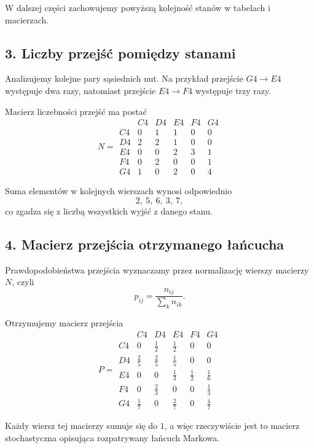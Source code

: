 \documentclass[11pt,a4paper]{article}
\theoremstyle{plain}
\theoremstyle{definition}
\begin{document}
\begin{rozwiazaniebox}
W dalszej cz\k{e}\'sci zachowujemy powy\.zsz\k{a} kolejno\'s\'c stan\'ow w tabelach i macierzach.

\subsection*{3. Liczby przej\'s\'c pomi\k{e}dzy stanami}

Analizujemy kolejne pary s\k{a}siednich nut. Na przyk\l ad przej\'scie \(G4 \to E4\) wyst\k{e}puje
dwa razy, natomiast przej\'scie \(E4 \to F4\) wyst\k{e}puje trzy razy.

Macierz liczebno\'sci przej\'s\'c ma posta\'c
\[
N=
\begin{array}{c|ccccc}
     & C4 & D4 & E4 & F4 & G4 \\ \hline
    C4 & 0 & 1 & 1 & 0 & 0 \\
    D4 & 2 & 2 & 1 & 0 & 0 \\
    E4 & 0 & 0 & 2 & 3 & 1 \\
    F4 & 0 & 2 & 0 & 0 & 1 \\
    G4 & 1 & 0 & 2 & 0 & 4
\end{array}
\]

Suma element\'ow w kolejnych wierszach wynosi odpowiednio
\[
    2,\ 5,\ 6,\ 3,\ 7,
\]
co zgadza si\k{e} z liczb\k{a} wszystkich wyj\'s\'c z danego stanu.

\subsection*{4. Macierz przej\'scia otrzymanego \l a\'ncucha}

Prawdopodobie\'nstwa przej\'scia wyznaczamy przez normalizacj\k{e} wierszy macierzy \(N\), czyli
\[
    p_{ij}=\frac{n_{ij}}{\sum\limits_k n_{ik}}.
\]

Otrzymujemy macierz przej\'scia
\[
P=
\begin{array}{c|ccccc}
     & C4 & D4 & E4 & F4 & G4 \\ \hline
    C4 & 0 & \tfrac{1}{2} & \tfrac{1}{2} & 0 & 0 \\
    D4 & \tfrac{2}{5} & \tfrac{2}{5} & \tfrac{1}{5} & 0 & 0 \\
    E4 & 0 & 0 & \tfrac{1}{3} & \tfrac{1}{2} & \tfrac{1}{6} \\
    F4 & 0 & \tfrac{2}{3} & 0 & 0 & \tfrac{1}{3} \\
    G4 & \tfrac{1}{7} & 0 & \tfrac{2}{7} & 0 & \tfrac{4}{7}
\end{array}
\]

Ka\.zdy wiersz tej macierzy sumuje si\k{e} do \(1\), a wi\k{e}c rzeczywi\'scie jest to macierz
stochastyczna opisuj\k{a}ca rozpatrywany \l a\'ncuch Markowa.


\end{rozwiazaniebox}
\end{document}
